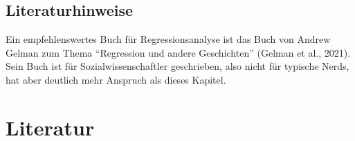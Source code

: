 \documentclass[
  letterpaper,
  twoside,
  open=any]{scrbook}
\theoremstyle{definition}
\theoremstyle{definition}
\theoremstyle{definition}
\theoremstyle{remark}
\begin{document}
\section{Literaturhinweise}\label{literaturhinweise-8}

Ein empfehlenswertes Buch für Regressionsanalyse ist das Buch von Andrew
Gelman zum Thema \enquote{Regression und andere Geschichten} (Gelman et
al., 2021). Sein Buch ist für Sozialwissenschaftler geschrieben, also
nicht für typische Nerds, hat aber deutlich mehr Anspruch als dieses
Kapitel.

\chapter*{Literatur}\label{literatur}

\end{document}
